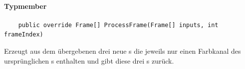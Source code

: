 \paragraph{Typmember}
\begin{itemize}

	\begin{verbatim}
	public override Frame[] ProcessFrame(Frame[] inputs, int frameIndex)
	\end{verbatim}
	Erzeugt aus dem übergebenen  drei neue s die jeweils nur einen Farbkanal des ursprünglichen s enthalten und gibt diese drei s zurück.
	
\end{itemize}
